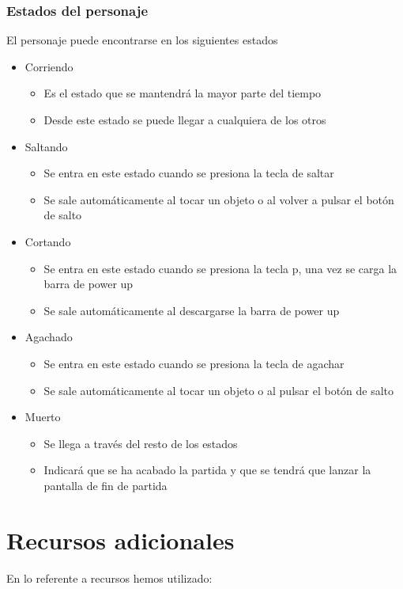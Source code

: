 \documentclass[palatino]{apuntes}
\begin{document}
\subsubsection{Estados del personaje}
El personaje puede encontrarse en los siguientes estados

\begin{itemize}
    \item Corriendo
    \begin{itemize}
        \item Es el estado que se mantendrá la mayor parte del tiempo
        \item Desde este estado se puede llegar a cualquiera de los otros
    \end{itemize}
    \item Saltando
    \begin{itemize}
        \item Se entra en este estado cuando se presiona la tecla de saltar
        \item Se sale automáticamente al tocar un objeto o al volver a pulsar el botón de salto
    \end{itemize}
   \item Cortando
    \begin{itemize}
        \item Se entra en este estado cuando se presiona la tecla p, una vez se carga la barra de power up
        \item Se sale automáticamente al descargarse la barra de power up
    \end{itemize}
    \item Agachado
    \begin{itemize}
        \item Se entra en este estado cuando se presiona la tecla de agachar
        \item Se sale automáticamente al tocar un objeto o al pulsar el botón de salto 
    \end{itemize}
    \item Muerto
    \begin{itemize}
        \item Se llega a través del resto de los estados
        \item Indicará que se ha acabado la partida y que se tendrá que lanzar la pantalla de fin de partida
    \end{itemize}
\end{itemize}


\section{Recursos adicionales}
En lo referente a recursos hemos utilizado:
\end{document}
